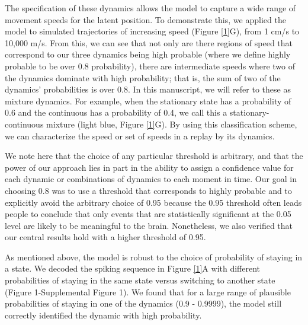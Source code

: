 \documentclass[times, twoside]{zHenriquesLab-StyleBioRxiv}
\begin{document}
The specification of these dynamics allows the model to capture a wide range of movement speeds for the latent position. To demonstrate this, we applied the model to simulated trajectories of increasing speed (Figure \ref{1}G), from 1 cm/s to 10,000 m/s. From this, we can see that not only are there regions of speed that correspond to our three dynamics being high probable (where we define highly probable to be over 0.8 probability), there are intermediate speeds where two of the dynamics dominate with high probability; that is, the sum of two of the dynamics' probabilities is over 0.8. In this manuscript, we will refer to these as mixture dynamics. For example, when the stationary state has a probability of 0.6 and the continuous has a probability of 0.4, we call this a stationary-continuous mixture (light blue, Figure \ref{1}G). By using this classification scheme, we can characterize the speed or set of speeds in a replay by its dynamics.

We note here that the choice of any particular threshold is arbitrary, and that the power of our approach lies in part in the ability to assign a confidence value for each dynamic or combinations of dynamics to each moment in time. Our goal in choosing 0.8 was to use a threshold that corresponds to highly probable and to explicitly avoid the arbitrary choice of 0.95 because the 0.95 threshold often leads people to conclude that only events that are statistically significant at the 0.05 level are likely to be meaningful to the brain. Nonetheless, we also verified that our central results hold with a higher threshold of 0.95. 

As mentioned above, the model is robust to the choice of probability of staying in a state. We decoded the spiking sequence in Figure \ref{1}A with different probabilities of staying in the same state versus switching to another state (Figure 1-Supplemental Figure 1). We found that for a large range of plausible probabilities of staying in one of the dynamics (0.9 - 0.9999), the model still correctly identified the dynamic with high probability.
\end{document}
